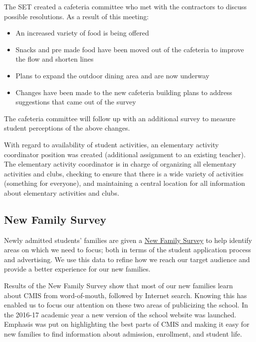 The SET created a cafeteria committee who met with the contractors to discuss possible resolutions. As a result of this meeting:
\begin{itemize}
\item An increased variety of food is being offered
\item Snacks and pre made food  have been moved out of the cafeteria to improve the flow and shorten lines
\item Plans to expand the outdoor dining area and are now underway
\item Changes have been made to the new cafeteria building plans to address suggestions that came out of the survey 
\end{itemize}

The cafeteria committee will follow up with an additional survey to measure student perceptions of the above changes.

With regard to availability of student activities, an elementary activity coordinator position was created (additional assignment to an existing teacher).  The elementary activity coordinator is in charge of organizing all elementary activities and clubs, checking to ensure that there is a wide variety of activities (something for everyone), and maintaining a central location for all information about elementary activities and clubs.

\subsection{New Family Survey}

Newly admitted students’ families are given a \href{https://docs.google.com/a/cmis.ac.th/forms/d/1basukpCBjcCMWXDh-cUUWW6lgk6zxYadGMn1EzFDQwc/viewanalytics}{New Family Survey} to help identify areas on which we need to focus; both in terms of the student application process and advertising. We use this data to refine how we reach our target audience and provide a better experience for our new families.


Results of the New Family Survey show that most of our new families learn about CMIS from word-of-mouth, followed by Internet search. Knowing this has enabled us to focus our attention on these two areas of publicizing the school. In the 2016-17 academic year a new version of the school website was launched. Emphasis was put on highlighting the best parts of CMIS and making it easy for new families to find information about admission, enrollment, and student life.

